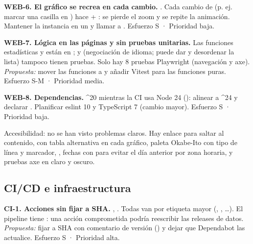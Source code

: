 \textbf{WEB-6. El gráfico se recrea en cada cambio.} . Cada cambio de  (p. ej. marcar una casilla en ) hace  + : se pierde el zoom y se repite la animación. Mantener la instancia en un  y llamar a . Esfuerzo S · Prioridad baja.

\textbf{WEB-7. Lógica en las páginas y sin pruebas unitarias.} Las funciones estadísticas  y  están en ;  y  (negociación de idioma;  puede dar  y desordenar la lista) tampoco tienen pruebas. Solo hay 8 pruebas Playwright (navegación y axe). \emph{Propuesta:} mover las funciones a  y añadir Vitest para las funciones puras. Esfuerzo S-M · Prioridad media.

\textbf{WEB-8. Dependencias.}  \textasciicircum{}20 mientras la CI usa Node 24 (): alinear a \textasciicircum{}24 y declarar . Planificar eslint 10 y TypeScript 7 (cambio mayor). Esfuerzo S · Prioridad baja.

Accesibilidad: no se han visto problemas claros. Hay enlace para saltar al contenido,  con tabla alternativa en cada gráfico, paleta Okabe-Ito con tipo de línea y marcador, , fechas con  para evitar el día anterior por zona horaria, y pruebas axe en claro y oscuro.

\subsection{CI/CD e infraestructura}

\textbf{CI-1. Acciones sin fijar a SHA.} , . Todas van por etiqueta mayor (, , …). El pipeline tiene : una acción comprometida podría reescribir las releases de datos. \emph{Propuesta:} fijar a SHA con comentario de versión () y dejar que Dependabot las actualice. Esfuerzo S · Prioridad alta.

